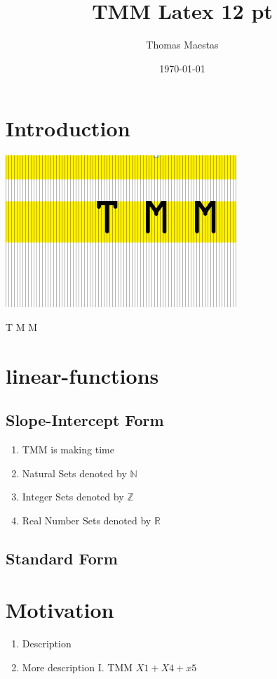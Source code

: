 \documentclass[12pt,letterpaper]{article}
\begin{document}
\date{\today}
\title{TMM Latex 12 pt}
\author{Thomas Maestas}
\maketitle
\section{Introduction} 
\begin{center}
\includegraphics[scale=0.5]{../assets/TMM.jpg}
\end{center}
\begin{huge}T M M 
\end{huge}
\section{linear-functions}
\subsection{Slope-Intercept Form}
\begin{enumerate}
\item TMM is making time
\item Natural Sets denoted by $\mathbb{N}$
\item Integer Sets denoted by $\mathbb{Z}$
\item Real Number Sets denoted by $\mathbb{R}$
\end{enumerate}
\subsection{Standard Form}
\section{Motivation}
\begin{enumerate}
\item Description
\item More description
I. TMM $X1 + X4 +x5$
\end{enumerate}
\end{document}
